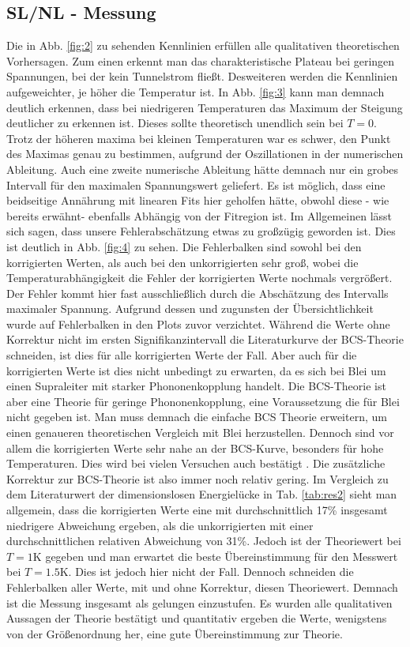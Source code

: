 \documentclass[twoside,        %
               BCOR12mm,       %
               english,ngerman, %
               fleqn,headsepline=false,footsepline=false
              ]{Vorlage/MFPREPORT}
\begin{document}
\subsection{SL/NL - Messung}
Die in Abb. \ref{fig:2} zu sehenden Kennlinien erfüllen alle qualitativen
theoretischen Vorhersagen. Zum einen erkennt man das charakteristische Plateau
bei geringen Spannungen, bei der kein Tunnelstrom fließt. Desweiteren werden
die Kennlinien aufgeweichter, je höher die Temperatur ist. In Abb.
\ref{fig:3} kann man demnach deutlich erkennen, dass bei niedrigeren
Temperaturen das Maximum der Steigung deutlicher zu erkennen ist. Dieses sollte
theoretisch unendlich sein bei $T=0$. Trotz der höheren maxima bei kleinen
Temperaturen war es schwer, den Punkt des Maximas genau zu bestimmen, aufgrund
der Oszillationen in der numerischen Ableitung. Auch eine zweite numerische
Ableitung hätte demnach nur ein grobes Intervall für den maximalen
Spannungswert geliefert. Es ist möglich, dass eine beidseitige Annährung mit
linearen Fits hier geholfen hätte, obwohl diese - wie bereits erwähnt-
ebenfalls Abhängig von der Fitregion ist. Im Allgemeinen lässt sich sagen, dass
unsere Fehlerabschätzung etwas zu großzügig geworden ist. Dies ist deutlich in
Abb. \ref{fig:4} zu sehen. Die Fehlerbalken sind sowohl bei den korrigierten
Werten, als auch bei den unkorrigierten sehr groß, wobei die
Temperaturabhängigkeit die Fehler der korrigierten Werte nochmals vergrößert.
Der Fehler kommt hier fast ausschließlich durch die Abschätzung des Intervalls
maximaler Spannung. Aufgrund dessen und zugunsten der Übersichtlichkeit wurde auf
Fehlerbalken in den Plots zuvor verzichtet.
Während die Werte ohne Korrektur nicht im ersten Signifikanzintervall die
Literaturkurve der BCS-Theorie schneiden, ist dies für alle korrigierten Werte
der Fall. Aber auch für die korrigierten Werte ist dies nicht unbedingt zu
erwarten, da es sich bei Blei um einen Supraleiter mit starker Phononenkopplung
handelt. Die BCS-Theorie ist aber eine Theorie für geringe Phononenkopplung,
eine Voraussetzung die für Blei nicht gegeben ist. Man muss demnach die
einfache BCS Theorie erweitern, um einen genaueren theoretischen Vergleich mit Blei
herzustellen. Dennoch sind vor allem die korrigierten Werte sehr nahe an der
BCS-Kurve, besonders für hohe Temperaturen. Dies wird bei vielen Versuchen auch
bestätigt \cite{enss2011tieftemperaturphysik}. Die zusätzliche Korrektur zur BCS-Theorie
ist also immer noch relativ gering. Im Vergleich zu dem Literaturwert der dimensionslosen
Energielücke in Tab. \ref{tab:res2} sieht man allgemein, dass die korrigierten
Werte eine mit durchschnittlich 17\% insgesamt niedrigere Abweichung ergeben,
als die unkorrigierten mit einer durchschnittlichen relativen Abweichung von
31\%. Jedoch ist der Theoriewert
bei $T=1$\;K gegeben und man erwartet die beste Übereinstimmung für den
Messwert bei $T=1.5$\;K. Dies ist jedoch hier nicht der Fall. Dennoch schneiden
die Fehlerbalken aller Werte, mit und ohne Korrektur, diesen Theoriewert.
Demnach ist die Messung insgesamt als gelungen einzustufen. Es wurden alle
qualitativen Aussagen der Theorie bestätigt und quantitativ ergeben die Werte,
wenigstens von der Größenordnung her, eine gute Übereinstimmung zur Theorie.
\end{document}
